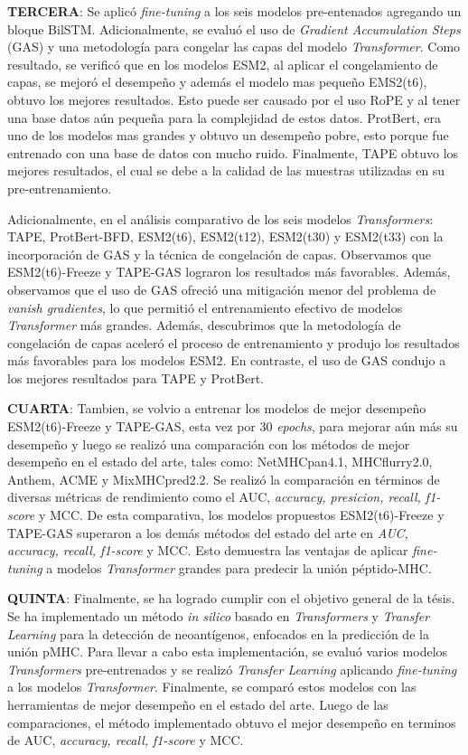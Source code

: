 \textbf{TERCERA}: Se aplicó \textit{fine-tuning} a los seis modelos pre-entenados agregando un bloque BilSTM. Adicionalmente, se evaluó el uso de \textit{Gradient Accumulation Steps} (GAS) y una metodología para congelar las capas del modelo \textit{Transformer}. Como resultado, se verificó que en los modelos ESM2, al aplicar el congelamiento de capas, se mejoró el desempeño y además el modelo mas pequeño EMS2(t6), obtuvo los mejores resultados. Esto puede ser causado por el uso RoPE y al tener una base datos aún pequeña para la complejidad de estos datos. ProtBert, era uno de los modelos mas grandes y obtuvo un desempeño pobre, esto porque fue entrenado con una base de datos con mucho ruido. Finalmente, TAPE obtuvo los mejores resultados, el cual se debe a la calidad de las muestras utilizadas en su pre-entrenamiento.


Adicionalmente, en el análisis comparativo de los seis modelos \textit{Transformers}: TAPE, ProtBert-BFD, ESM2(t6), ESM2(t12), ESM2(t30) y ESM2(t33) con la incorporación de GAS y la técnica de congelación de capas. Observamos que ESM2(t6)-Freeze y TAPE-GAS lograron los resultados más favorables. Además, observamos que el uso de GAS ofreció una mitigación menor del problema de \textit{vanish gradientes}, lo que permitió el entrenamiento efectivo de modelos \textit{Transformer} más grandes. Además, descubrimos que la metodología de congelación de capas aceleró el proceso de entrenamiento y produjo los resultados más favorables para los modelos ESM2. En contraste, el uso de GAS condujo a los mejores resultados para TAPE y ProtBert.

\textbf{CUARTA}: Tambien, se volvio a entrenar los modelos de mejor desempeño ESM2(t6)-Freeze y TAPE-GAS, esta vez por 30 \textit{epochs}, para mejorar aún más su desempeño y luego se realizó una comparación con los métodos de mejor desempeño en el estado del arte, tales como: NetMHCpan4.1, MHCflurry2.0, Anthem, ACME y MixMHCpred2.2. Se realizó la comparación en términos de diversas métricas de rendimiento como el AUC, \textit{accuracy, presicion, recall, f1-score} y MCC. De esta comparativa, los modelos propuestos ESM2(t6)-Freeze y TAPE-GAS superaron a los demás métodos del estado del arte en \textit{AUC, accuracy, recall, f1-score} y MCC. Esto demuestra las ventajas de aplicar \textit{fine-tuning} a modelos \textit{Transformer} grandes para predecir la unión péptido-MHC.



\textbf{QUINTA}: Finalmente, se ha logrado cumplir con el objetivo general de la tésis. Se ha implementado un método  \textit{in silico} basado en \textit{Transformers} y \textit{Transfer Learning} para la detección de neoantígenos, enfocados en la predicción de la unión pMHC. Para llevar a cabo esta implementación, se evaluó varios modelos \textit{Transformers} pre-entrenados y se realizó \textit{Transfer Learning} aplicando \textit{fine-tuning} a los modelos \textit{Transformer}. Finalmente, se comparó estos modelos con las herramientas de mejor desempeño en el estado del arte. Luego de las comparaciones, el método implementado obtuvo el mejor desempeño en terminos de AUC, \textit{accuracy, recall, f1-score} y MCC.


